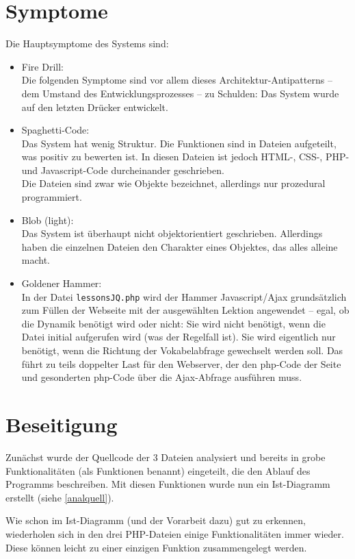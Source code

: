\documentclass{scrartcl}
\begin{document}
\section{Symptome}
Die Hauptsymptome des Systems sind:
\begin{itemize}
\item Fire Drill:\\
Die folgenden Symptome sind vor allem dieses Architektur-Antipatterns -- dem Umstand des Entwicklungsprozesses -- zu Schulden: Das System wurde auf den letzten Drücker entwickelt. 
\item Spaghetti-Code:\\
Das System hat wenig Struktur. Die Funktionen sind in Dateien aufgeteilt, was positiv zu bewerten ist. In diesen Dateien ist jedoch HTML-, CSS-, PHP- und Javascript-Code durcheinander geschrieben.\\
Die Dateien sind zwar wie Objekte bezeichnet, allerdings nur prozedural programmiert.
\item Blob (light):\\
Das System ist überhaupt nicht objektorientiert geschrieben. Allerdings haben die einzelnen Dateien den Charakter eines Objektes, das alles alleine macht.
\item Goldener Hammer:\\
In der Datei \lstinline`lessonsJQ.php` wird der Hammer Javascript/Ajax grundsätzlich zum Füllen der Webseite mit der ausgewählten Lektion angewendet -- egal, ob die Dynamik benötigt wird oder nicht: Sie wird nicht benötigt, wenn die Datei initial aufgerufen wird (was der Regelfall ist). Sie wird eigentlich nur benötigt, wenn die Richtung der Vokabelabfrage gewechselt werden soll. Das führt zu teils doppelter Last für den Webserver, der den php-Code der Seite und gesonderten php-Code über die Ajax-Abfrage ausführen muss.
\end{itemize}


\section{Beseitigung}

Zunächst wurde der Quellcode der 3 Dateien analysiert und bereits in grobe Funktionalitäten (als Funktionen benannt) eingeteilt, die den Ablauf des Programms beschreiben. Mit diesen Funktionen wurde nun ein Ist-Diagramm erstellt (siehe \autoref{analquell}).

Wie schon im Ist-Diagramm (und der Vorarbeit dazu) gut zu erkennen, wiederholen sich in den drei PHP-Dateien einige Funktionalitäten immer wieder. Diese können leicht zu einer einzigen Funktion zusammengelegt werden. 
\end{document}
